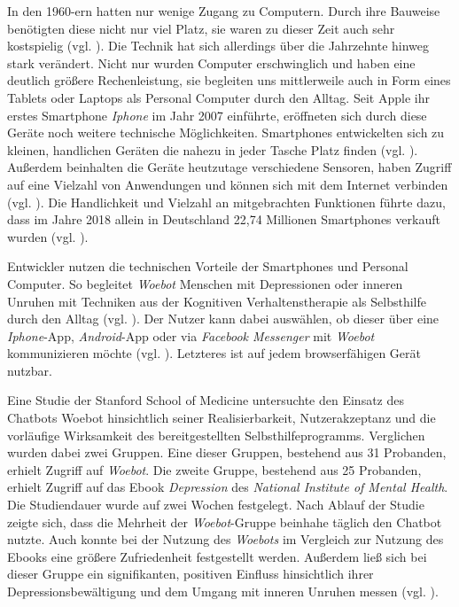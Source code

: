 In den 1960-ern hatten nur wenige Zugang zu Computern. Durch ihre Bauweise benötigten diese nicht nur viel Platz, sie waren zu dieser Zeit auch sehr kostspielig (vgl. \cite{SWB-11524946X}). Die Technik hat sich allerdings über die Jahrzehnte hinweg stark verändert. Nicht nur wurden Computer erschwinglich und haben eine deutlich größere Rechenleistung, sie begleiten uns mittlerweile auch in Form eines Tablets oder Laptops als Personal Computer durch den Alltag. Seit Apple ihr erstes Smartphone \emph{Iphone} im Jahr 2007 einführte, eröffneten sich durch diese Geräte noch weitere technische Möglichkeiten. Smartphones entwickelten sich zu kleinen, handlichen Geräten die nahezu in jeder Tasche Platz finden (vgl. \cite{SWB-481290869}). Außerdem beinhalten die Geräte heutzutage verschiedene Sensoren, haben Zugriff auf eine Vielzahl von Anwendungen und können sich mit dem Internet verbinden (vgl. \cite{SWB-481290869}\cite{AppStore21:online}). Die Handlichkeit und Vielzahl an mitgebrachten Funktionen führte dazu, dass im Jahre 2018 allein in Deutschland 22,74 Millionen Smartphones verkauft wurden (vgl. \cite{Zukunftd37:online}). 

Entwickler nutzen die technischen Vorteile der Smartphones und Personal Computer. So begleitet \emph{Woebot} Menschen mit Depressionen oder inneren Unruhen mit Techniken aus der Kognitiven Verhaltenstherapie als Selbsthilfe durch den Alltag (vgl. \cite{Fitzpatrick2017}). Der Nutzer kann dabei auswählen, ob dieser über eine \emph{Iphone}-App, \emph{Android}-App oder via \emph{Facebook Messenger} mit \emph{Woebot} kommunizieren möchte (vgl. \cite{WoebotYo93:online}). Letzteres ist auf jedem browserfähigen Gerät nutzbar.  

Eine Studie der Stanford School of Medicine untersuchte den Einsatz des Chatbots Woebot hinsichtlich seiner Realisierbarkeit, Nutzerakzeptanz und die vorläufige Wirksamkeit des bereitgestellten Selbsthilfeprogramms. Verglichen wurden dabei zwei Gruppen. Eine dieser Gruppen, bestehend aus 31 Probanden, erhielt Zugriff auf \emph{Woebot}. Die zweite Gruppe, bestehend aus 25 Probanden, erhielt Zugriff auf das Ebook \emph{Depression} des \emph{National Institute of Mental Health}. Die Studiendauer wurde auf zwei Wochen festgelegt. Nach Ablauf der Studie zeigte sich, dass die Mehrheit der \emph{Woebot}-Gruppe beinhahe täglich den Chatbot nutzte. Auch konnte bei der Nutzung des \emph{Woebots} im Vergleich zur Nutzung des Ebooks eine größere Zufriedenheit festgestellt werden. Außerdem ließ sich bei dieser Gruppe ein signifikanten, positiven Einfluss hinsichtlich ihrer Depressionsbewältigung und dem Umgang mit inneren Unruhen messen (vgl. \cite{Fitzpatrick2017}).

